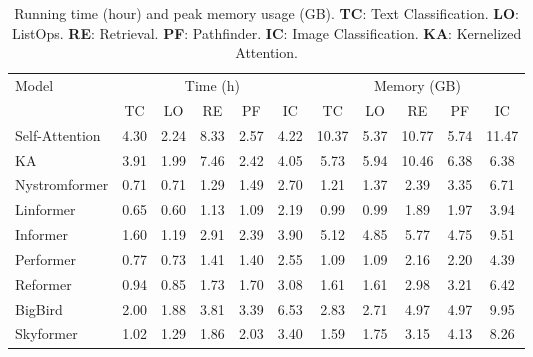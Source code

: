 \begin{table}
\caption{Running time (hour) and peak memory usage (GB). \textbf{TC}: Text Classification. \textbf{LO}: ListOps. \textbf{RE}: Retrieval. \textbf{PF}: Pathfinder. \textbf{IC}: Image Classification. \textbf{KA}: Kernelized Attention.}
\label{table:lra_timespace}
\centering
\begin{tabular}{lcccccccccc}
\toprule
\multirow{2}{*}{Model} &
\multicolumn{5}{c}{Time (h)} &
\multicolumn{5}{c}{Memory (GB)} \\
 & TC    & LO & RE & PF & IC  & TC    & LO & RE & PF  & IC \\
\midrule
Self-Attention & 4.30 & 	2.24 & 	8.33 & 	2.57 & 	4.22 & 	10.37 & 		5.37 & 	10.77 & 	5.74 & 	11.47\\
KA & 3.91 & 	1.99 & 	7.46 & 	2.42 & 	4.05 & 	5.73 & 	5.94 & 	10.46 & 	6.38 & 	6.38\\
\cmidrule(r){2-6}
\cmidrule(r){7-11}
Nystromformer  &  0.71 &  	0.71 &  	1.29 &  	1.49 &  	2.70 &  	1.21 &  	1.37 &  	2.39 &  	3.35 &  	6.71\\
Linformer  & 0.65 & 	0.60 & 	1.13 & 	1.09 & 	2.19 & 	0.99 & 	0.99	 & 1.89 & 	1.97	 & 3.94 \\
Informer  & 1.60 & 	1.19 & 	2.91 & 	2.39 & 	3.90 & 	5.12 & 	4.85 & 	5.77 & 	4.75 & 	9.51 \\
Performer  &  0.77 &  	0.73 &  	1.41 &  	1.40 &  	2.55 &  	1.09 &  	1.09 &  	2.16 &  	2.20 &  	4.39\\
Reformer  &    0.94	 &  0.85 &  	1.73 &  	1.70 &  	3.08 &  	1.61 &  	1.61 &  	2.98 &  	3.21 &  	6.42\\
BigBird & 2.00 & 	1.88 & 	3.81 & 	3.39 & 	6.53 & 	2.83 & 	2.71 & 	4.97 & 	4.97 & 	9.95 \\
\cmidrule(r){2-6}
\cmidrule(r){7-11}
Skyformer  &   1.02 &  	1.29 &  	1.86 &  	2.03 &  	3.40 &  	1.59 &  	1.75 &  	3.15 &  	4.13 &  	8.26 \\
\bottomrule
\end{tabular}
\end{table}
